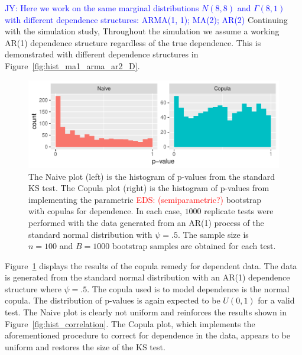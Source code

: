 \documentclass[12pt, letterpaper, titlepage]{article}
\newcommand{\jy}[1]{\textcolor{blue}{JY: #1}}
\newcommand{\eds}[1]{\textcolor{red}{EDS: (#1)}}
\begin{document}
\jy{Here we work on the same marginal distributions $N(8, 8)$ and $\Gamma(8, 1)$
  with different dependence structures:
  ARMA(1, 1); MA(2); AR(2)
  }
Continuing with the simulation study, 
Throughout the simulation we assume a working AR(1) dependence structure
regardless of the true dependence. This is demonstrated with different dependence
structures in Figure~\ref{fig:hist_ma1_arma_ar2_D}.

\begin{figure}[tbp]
  \centering
  \includegraphics[width=\textwidth]{hist_ar1_D}
  \caption{The Naive plot (left) is the histogram of p-values from the
  standard KS test. The Copula plot (right) is the histogram of p-values from
  implementing the parametric \eds{semiparametric?} bootstrap with copulas for
	dependence. In each case,
  $1000$ replicate tests were performed with the data generated from an AR(1)
  process of the standard normal distribution with $\psi = .5$. The sample size
  is $n = 100$ and $B = 1000$ bootstrap samples are obtained for each test.}
  \label{fig:hist_ar1_D}
\end{figure}

Figure~\ref{fig:hist_ar1_D} displays the results of the copula remedy for
dependent data. The data is generated from the standard normal distribution with
an AR(1) dependence structure where $\psi = .5$. The copula used is to model
dependence is the normal copula. The distribution of p-values is again expected
to be $U(0, 1)$ for a valid test. The Naive plot is clearly not uniform and
reinforces the results shown in Figure~\ref{fig:hist_correlation}. The Copula
plot, which implements the aforementioned procedure to correct for dependence
in the data, appears to be uniform and restores the size of the KS test.
\end{document}
